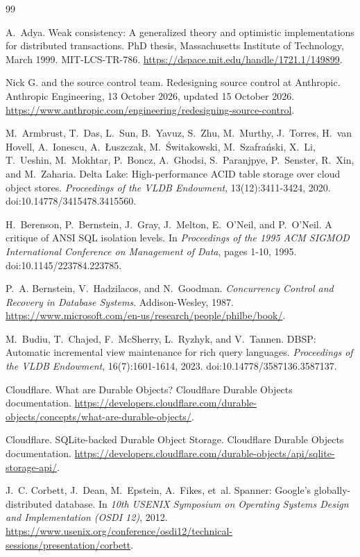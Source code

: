 \documentclass[11pt,letterpaper]{article}
\theoremstyle{definition}
\theoremstyle{remark}
\begin{document}
\begin{thebibliography}{99}
\small

A.~Adya.
Weak consistency: A generalized theory and optimistic implementations for distributed transactions.
PhD thesis, Massachusetts Institute of Technology, March 1999. MIT-LCS-TR-786.
\url{https://dspace.mit.edu/handle/1721.1/149899}.

Nick G. and the source control team.
Redesigning source control at Anthropic.
Anthropic Engineering, 13 October 2026, updated 15 October 2026.
\url{https://www.anthropic.com/engineering/redesigning-source-control}.

M.~Armbrust, T.~Das, L.~Sun, B.~Yavuz, S.~Zhu, M.~Murthy, J.~Torres, H.~van Hovell, A.~Ionescu, A.~{\L}uszczak, M.~{\'S}witakowski, M.~Szafra{\'n}ski, X.~Li, T.~Ueshin, M.~Mokhtar, P.~Boncz, A.~Ghodsi, S.~Paranjpye, P.~Senster, R.~Xin, and M.~Zaharia.
Delta Lake: High-performance ACID table storage over cloud object stores.
\emph{Proceedings of the VLDB Endowment}, 13(12):3411-3424, 2020.
doi:10.14778/3415478.3415560.

H.~Berenson, P.~Bernstein, J.~Gray, J.~Melton, E.~O'Neil, and P.~O'Neil.
A critique of ANSI SQL isolation levels.
In \emph{Proceedings of the 1995 ACM SIGMOD International Conference on Management of Data}, pages 1-10, 1995.
doi:10.1145/223784.223785.

P.~A. Bernstein, V.~Hadzilacos, and N.~Goodman.
\emph{Concurrency Control and Recovery in Database Systems}.
Addison-Wesley, 1987.
\url{https://www.microsoft.com/en-us/research/people/philbe/book/}.

M.~Budiu, T.~Chajed, F.~McSherry, L.~Ryzhyk, and V.~Tannen.
DBSP: Automatic incremental view maintenance for rich query languages.
\emph{Proceedings of the VLDB Endowment}, 16(7):1601-1614, 2023.
doi:10.14778/3587136.3587137.

Cloudflare.
What are Durable Objects?
Cloudflare Durable Objects documentation.
\url{https://developers.cloudflare.com/durable-objects/concepts/what-are-durable-objects/}.

Cloudflare.
SQLite-backed Durable Object Storage.
Cloudflare Durable Objects documentation.
\url{https://developers.cloudflare.com/durable-objects/api/sqlite-storage-api/}.

J.~C. Corbett, J.~Dean, M.~Epstein, A.~Fikes, et~al.
Spanner: Google's globally-distributed database.
In \emph{10th USENIX Symposium on Operating Systems Design and Implementation (OSDI 12)}, 2012.
\url{https://www.usenix.org/conference/osdi12/technical-sessions/presentation/corbett}.


\end{thebibliography}
\end{document}
